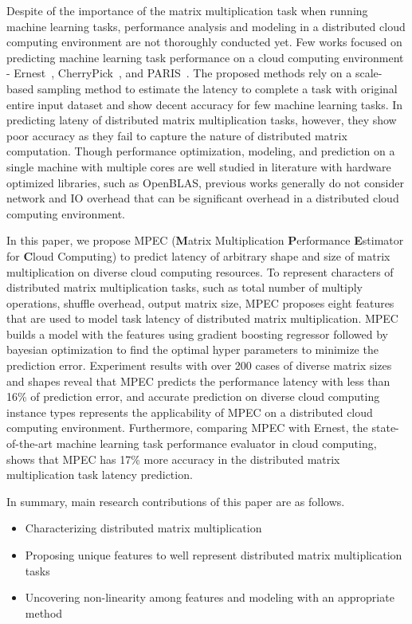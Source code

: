 \documentclass[10pt, conference, compsocconf]{IEEEtran}
\begin{document}
Despite of the importance of the matrix multiplication task when running machine learning tasks, performance analysis and modeling in a distributed cloud computing environment are not thoroughly conducted yet. Few works focused on predicting machine learning task performance on a cloud computing environment - Ernest~\cite{ernest}, CherryPick~\cite{cherrypick}, and PARIS~\cite{paris}. The proposed methods rely on a scale-based sampling method to estimate the latency to complete a task with original entire input dataset and show decent accuracy for few machine learning tasks. In predicting lateny of distributed matrix multiplication tasks, however, they show poor accuracy as they fail to capture the nature of distributed matrix computation. Though performance optimization, modeling, and prediction on a single machine with multiple cores are well studied in literature with hardware optimized libraries, such as OpenBLAS, previous works generally do not consider network and IO overhead that can be significant overhead in a distributed cloud computing environment.

In this paper, we propose MPEC (\textbf{M}atrix Multiplication \textbf{P}erformance \textbf{E}stimator for \textbf{C}loud Computing) to predict latency of arbitrary shape and size of matrix multiplication on diverse cloud computing resources. To represent characters of distributed matrix multiplication tasks, such as total number of multiply operations, shuffle overhead, output matrix size, MPEC proposes eight features that are used to model task latency of distributed matrix multiplication. MPEC builds a model with the features using gradient boosting regressor followed by bayesian optimization to find the optimal hyper parameters to minimize the prediction error. Experiment results with over 200 cases of diverse matrix sizes and shapes reveal that MPEC predicts the performance latency with less than 16\% of prediction error, and accurate prediction on diverse cloud computing instance types represents the applicability of MPEC on a distributed cloud computing environment. Furthermore, comparing MPEC with Ernest, the state-of-the-art machine learning task performance evaluator in cloud computing, shows that MPEC has 17\% more accuracy in the distributed matrix multiplication task latency prediction. 

In summary, main research contributions of this paper are as follows.
\begin{itemize}
  \item{Characterizing distributed matrix multiplication}
  \item{Proposing unique features to well represent distributed matrix multiplication tasks}
  \item{Uncovering non-linearity among features and modeling with an appropriate method}
\end{itemize}
\end{document}
